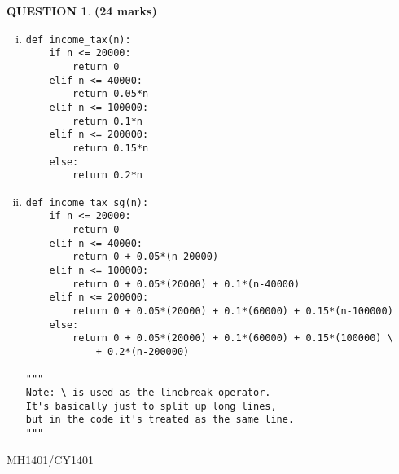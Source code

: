 \documentclass[a4paper,12pt]{article}
\theoremstyle{definition}
\newtheorem{ques}[dummy]{QUESTION}
\theoremstyle{plain}
\newcommand{\py}{python}
\begin{document}
	
	\begin{ques}\hfill\textbf{(24 marks)}\\
		\begin{enumerate}[(i)]
			\item 
			\begin{verbatim}
def income_tax(n):
    if n <= 20000:
        return 0
    elif n <= 40000:
        return 0.05*n
    elif n <= 100000:
        return 0.1*n
    elif n <= 200000:
        return 0.15*n
    else:
        return 0.2*n
			\end{verbatim}
			\item
			\begin{verbatim}
def income_tax_sg(n):
    if n <= 20000:
        return 0
    elif n <= 40000:
        return 0 + 0.05*(n-20000)
    elif n <= 100000:
        return 0 + 0.05*(20000) + 0.1*(n-40000)
    elif n <= 200000:
        return 0 + 0.05*(20000) + 0.1*(60000) + 0.15*(n-100000)
    else:
        return 0 + 0.05*(20000) + 0.1*(60000) + 0.15*(100000) \
            + 0.2*(n-200000)

"""
Note: \ is used as the linebreak operator.
It's basically just to split up long lines,
but in the code it's treated as the same line.
"""
			\end{verbatim}
		\end{enumerate}
	\end{ques}
	
	\newpage
	\hfill MH1401/CY1401\vspace*{0.5em}
	
\end{document}
